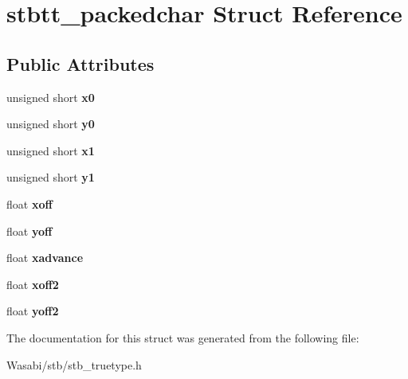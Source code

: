 \hypertarget{structstbtt__packedchar}{}\section{stbtt\+\_\+packedchar Struct Reference}
\label{structstbtt__packedchar}
\subsection*{Public Attributes}
\begin{DoxyCompactItemize}
\item 
unsigned short {\bfseries x0}\hypertarget{structstbtt__packedchar_a02cb73a5af37ed60dafd5e4b731af09e}{}\label{structstbtt__packedchar_a02cb73a5af37ed60dafd5e4b731af09e}

\item 
unsigned short {\bfseries y0}\hypertarget{structstbtt__packedchar_a43429c9545ca8ccf14012cedcf83c1a7}{}\label{structstbtt__packedchar_a43429c9545ca8ccf14012cedcf83c1a7}

\item 
unsigned short {\bfseries x1}\hypertarget{structstbtt__packedchar_a99d371f0261cd13dfd1a179f143175d1}{}\label{structstbtt__packedchar_a99d371f0261cd13dfd1a179f143175d1}

\item 
unsigned short {\bfseries y1}\hypertarget{structstbtt__packedchar_a9569073ba79fad355210b6ffc35905a7}{}\label{structstbtt__packedchar_a9569073ba79fad355210b6ffc35905a7}

\item 
float {\bfseries xoff}\hypertarget{structstbtt__packedchar_adb30c50674c79d32116ae6f94bd5893f}{}\label{structstbtt__packedchar_adb30c50674c79d32116ae6f94bd5893f}

\item 
float {\bfseries yoff}\hypertarget{structstbtt__packedchar_a6f342ae10df5319f4999ffd256567142}{}\label{structstbtt__packedchar_a6f342ae10df5319f4999ffd256567142}

\item 
float {\bfseries xadvance}\hypertarget{structstbtt__packedchar_a28707ae98d1fa946b3390840aeff76ab}{}\label{structstbtt__packedchar_a28707ae98d1fa946b3390840aeff76ab}

\item 
float {\bfseries xoff2}\hypertarget{structstbtt__packedchar_a3a33880f925ca826c908cbf9f0673c9f}{}\label{structstbtt__packedchar_a3a33880f925ca826c908cbf9f0673c9f}

\item 
float {\bfseries yoff2}\hypertarget{structstbtt__packedchar_a2ec5bbd1010c9a9b7cbdeb7503dcaffa}{}\label{structstbtt__packedchar_a2ec5bbd1010c9a9b7cbdeb7503dcaffa}

\end{DoxyCompactItemize}


The documentation for this struct was generated from the following file\+:\begin{DoxyCompactItemize}
\item 
Wasabi/stb/stb\+\_\+truetype.\+h\end{DoxyCompactItemize}
